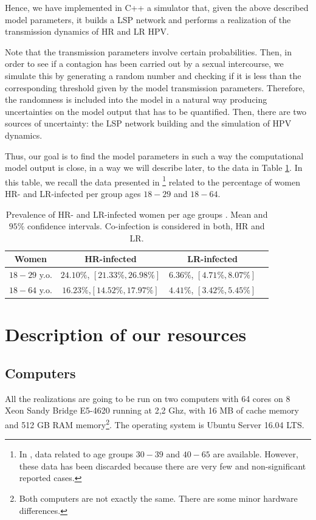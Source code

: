 Hence, we have implemented in C++ a simulator that, given the above described model parameters, it builds a LSP network and performs a realization of the transmission dynamics of HR and LR HPV.

Note that the transmission parameters involve certain probabilities. Then, in order to see if a contagion has been carried out by a sexual intercourse, we simulate this by generating a random number and checking if it is less than the corresponding threshold given by the model transmission parameters. Therefore, the randomness is included into the model in a natural way producing uncertainties on the model output that has to be quantified. Then, there are two sources of uncertainty: the LSP network building and the simulation of HPV dynamics.

Thus, our goal is to find the model parameters in such a way the computational model output is close, in a way we will describe later, to the data in Table \ref{datos}. In this table, we recall the data presented in \cite{castellsague2012prevalence}\footnote{In \cite{castellsague2012prevalence}, data related to age groups $30-39$ and $40-65$ are available. However, these data has been discarded because there are very few and non-significant reported cases.} related to the percentage of women HR- and LR-infected per group ages $18-29$ and $18-64$. \\

\begin{table}[h]
	\centering
	\begin{tabular}{c|ccc}
		Women & HR-infected & LR-infected \\
		\hline
		$18-29$ y.o. & $24.10\%$, $[21.33\%, 26.98\%]$ & $6.36\%$, $[4.71\%, 8.07\%]$ \\
		$18-64$ y.o. & $16.23\%$,$[14.52\%, 17.97\%]$ & $4.41\%$, $[3.42\%, 5.45\%]$ \\
	\end{tabular}
	\caption{Prevalence of HR- and LR-infected women per age groups \cite{castellsague2012prevalence}. Mean and $95\%$ confidence intervals. Co-infection is considered in both, HR and LR.}
	\label{datos}
\end{table}

\section{Description of our resources}

\subsection{Computers}
All the realizations are going to be run on two computers with 64 cores on 8 Xeon Sandy Bridge E5-4620 running at 2,2 Ghz, with 16 MB of cache memory and 512 GB RAM memory\footnote{Both computers are not exactly the same. There are some minor hardware differences.}. The operating system is Ubuntu Server 16.04 LTS. 

